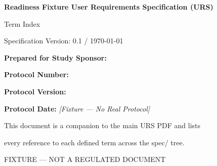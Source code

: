 
\thispagestyle{empty}

\vspace*{2cm}

\begin{center}
  {\Huge\bfseries Readiness Fixture User Requirements Specification (URS)\par}
  \vspace{0.5cm}
  {\LARGE Term Index\par}
  \vspace{1.5cm}
  {\Large Specification Version: 0.1 / \today\par}
\end{center}

\vspace{4cm}

\noindent\textbf{Prepared for Study Sponsor:} \sponsorName\par
\vspace{0.5em}
\noindent\textbf{Protocol Number:} \protocolNumber\par
\vspace{0.5em}
\noindent\textbf{Protocol Version:} \protocolVersion\par
\vspace{0.5em}
\noindent\textbf{Protocol Date:} \textit{[Fixture — No Real Protocol]}\par

\vfill

\begin{center}
  \small This document is a companion to the main URS PDF and lists\par
  every reference to each defined term across the spec/ tree.\par
  \vspace{0.5em}
  FIXTURE — NOT A REGULATED DOCUMENT\par
\end{center}

